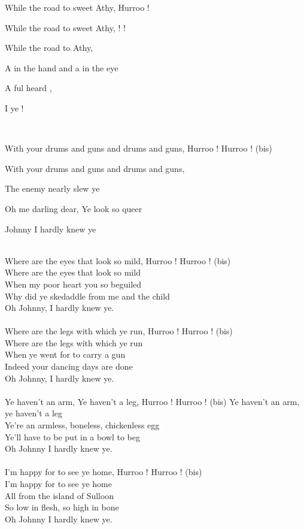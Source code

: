 \begin{SBVerse*}
While  the road to sweet Athy,  Hurroo !

While  the road to sweet Athy,  !  !

While  the road to  Athy,

A  in the hand and a  in the eye

A ful   heard ,

 I   ye !
\end{SBVerse*}
~\\
\begin{SBChorus}
With your drums and guns and drums and guns, Hurroo ! Hurroo ! (bis)

With your drums and guns and drums and guns,

The enemy nearly slew ye

Oh me darling dear, Ye look so queer

Johnny I hardly knew ye
\end{SBChorus}
~\\
Where are the eyes that look so mild, Hurroo ! Hurroo ! (bis) \\
Where are the eyes that look so mild \\
When my poor heart you so beguiled \\
Why did ye skedaddle from me and the child \\
Oh Johnny, I hardly knew ye. \\
~\\
Where are the legs with which ye run, Hurroo ! Hurroo ! (bis)\\
Where are the legs with which ye run \\
When ye went for to carry a gun \\
Indeed your dancing days are done \\
Oh Johnny, I hardly knew ye. \\
~\\
Ye haven't an arm, Ye haven't a leg, Hurroo ! Hurroo ! (bis)
Ye haven't an arm, ye haven't a leg \\
Ye're an armless, boneless, chickenless egg \\
Ye'll have to be put in a bowl to beg \\
Oh Johnny I hardly knew ye. \\
~\\
I'm happy for to see ye home, Hurroo ! Hurroo ! (bis)\\
I'm happy for to see ye home \\
All from the island of Sulloon \\
So low in flesh, so high in bone \\
Oh Johnny I hardly knew ye. \\
